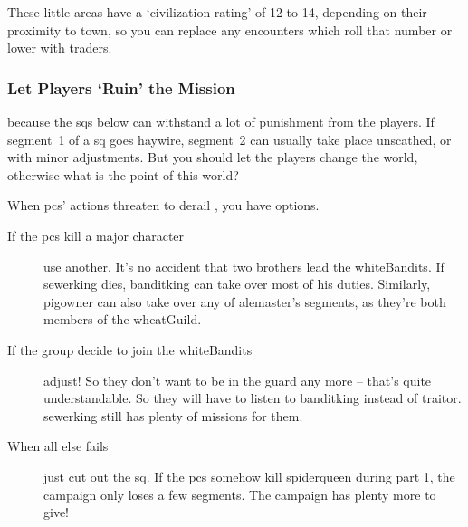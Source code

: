 \begin{multicols}{2}
These little areas have a `civilization rating' of 12 to 14, depending on their proximity to town, so you can replace any encounters which roll that number or lower with traders.%

\subsubsection{Let Players `Ruin' the Mission}
because the \glspl{sq} below can withstand a lot of punishment from the players.
If \gls{segment}~1 of a \gls{sq} goes haywire, \gls{segment}~2 can usually take place unscathed, or with minor adjustments.
But you should let the players change the world, otherwise what is the point of this world?

When \glspl{pc}' actions threaten to derail , you have options.

\begin{description}
  \item[If the \glspl{pc} kill a major character]
  use another.
  It's no accident that two brothers lead the \gls{whiteBandits}.
  If \gls{sewerking} dies, \gls{banditking} can take over most of his duties.
  Similarly, \gls{pigowner} can also take over any of \gls{alemaster}'s \glspl{segment}, as they're both members of the \gls{wheatGuild}.
  \item[If the group decide to join the \gls{whiteBandits}]
  adjust!
  So they don't want to be in the \gls{guard} any more -- that's quite understandable.
  So they will have to listen to \gls{banditking} instead of \gls{traitor}.
  \Gls{sewerking} still has plenty of missions for them.
  \item[When all else fails]
  just cut out the \gls{sq}.
  If the \glspl{pc} somehow kill \gls{spiderqueen} during part 1, the campaign only loses a few \glspl{segment}.
  The campaign has plenty more to give!
\end{description}

\end{multicols}


\printglossary[
  type=people,
  style=topicmcols,
]

